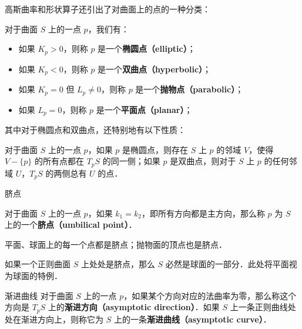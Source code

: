 高斯曲率和形状算子还引出了对曲面上的点的一种分类：

\begin{definition}{}
对于曲面 $S$ 上的一点 $p$，我们有：
\begin{itemize}
\item 如果 $K_p>0$，则称 $p$ 是一个\textbf{椭圆点（elliptic）}；
\item 如果 $K_p<0$，则称 $p$ 是一个\textbf{双曲点（hyperbolic）}；
\item 如果 $K_p=0$ 但 $L_p\not=0$，则称 $p$ 是一个\textbf{抛物点（parabolic）}；
\item 如果 $L_p=0$，则称 $p$ 是一个\textbf{平面点（planar）}；
\end{itemize}
\end{definition}

其中对于椭圆点和双曲点，还特别地有以下性质：
\begin{theorem}{}
对于曲面 $S$ 上的一点 $p$，如果 $p$ 是椭圆点，则存在 $S$ 上 $p$ 的邻域 $V$，使得 $V-\{p\}$ 的所有点都在 $T_pS$ 的同一侧；如果 $p$ 是双曲点，则对于 $S$ 上 $p$ 的任何邻域 $U$，$T_pS$ 的两侧总有 $U$ 的点．
\end{theorem}


\begin{definition}{脐点}

对于曲面 $S$ 上的一点 $p$，如果 $k_1=k_2$，即所有方向都是主方向，那么称 $p$ 为 $S$ 上的一个\textbf{脐点（umbilical point）}．

\end{definition}

平面、球面上的每一个点都是脐点；抛物面的顶点也是脐点．

\begin{theorem}{}
如果一个正则曲面 $S$ 上处处是脐点，那么 $S$ 必然是球面的一部分．此处将平面视为球面的特例．
\end{theorem}

\begin{definition}{渐进曲线}
对于曲面 $S$ 上的一点 $p$，如果某个方向对应的法曲率为零，那么称这个方向是 $T_pS$ 上的\textbf{渐进方向（asymptotic direction）}．如果 $S$ 上一条正则曲线处处在渐进方向上，则称它为 $S$ 上的一条\textbf{渐进曲线（asymptotic curve）}．


\end{definition}


